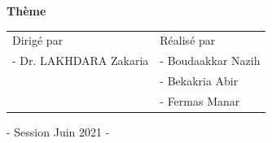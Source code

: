 \documentclass[12pt,french]{report}
\begin{document}
\begin{titlepage}
\begin{center}
			\vspace{0.025\textheight}			
			\textbf{\large{Thème}}
			
			\vspace{0.025\textheight}			
		\end{center}
	
		\vspace{0.05\textheight}

		\begin{tabular}{l l}
			\Large Dirigé par & \Large Réalisé par\\
			\multirow{1}{24em}{\large{- Dr. LAKHDARA Zakaria}} & \large{- Boudaakkar Nazih}\\
			& \large{- Bekakria Abir}\\
			& \large{- Fermas Manar}\\
		\end{tabular}
		\vspace{4.3em}
		
		\centering
		- Session Juin 2021 -
	\end{titlepage}
\tableofcontents
\listoffigures
\listoftables

\pagebreak



\end{document}

